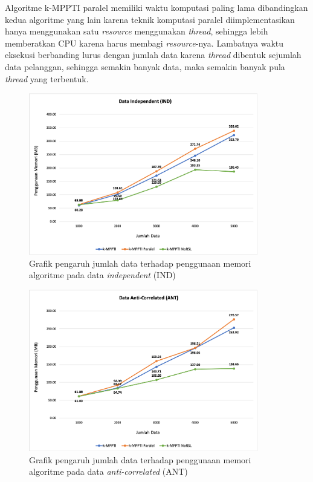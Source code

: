 Algoritme k-MPPTI paralel memiliki waktu komputasi paling lama dibandingkan kedua algoritme yang lain karena teknik komputasi paralel diimplementasikan hanya menggunakan satu \textit{resource} menggunakan \textit{thread}, sehingga lebih memberatkan CPU karena harus membagi \textit{resource}-nya. Lambatnya waktu eksekusi berbanding lurus dengan jumlah data karena \textit{thread} dibentuk sejumlah data pelanggan, sehingga semakin banyak data, maka semakin banyak pula \textit{thread} yang terbentuk.

\begin{figure}[H]
	\centering
	\includegraphics[width=10cm]{assets/img/bab5/grafik-ind-jml-mem.png}
	\caption{Grafik pengaruh jumlah data terhadap penggunaan memori algoritme pada data \textit{independent} (IND)}
	\label{fig:grafik-ind-jml-mem}
\end{figure}

\begin{figure}[H]
	\centering
	\includegraphics[width=10cm]{assets/img/bab5/grafik-ant-jml-mem.png}
	\caption{Grafik pengaruh jumlah data terhadap penggunaan memori algoritme pada data \textit{anti-correlated} (ANT)}
	\label{fig:grafik-ant-jml-mem}
\end{figure}

